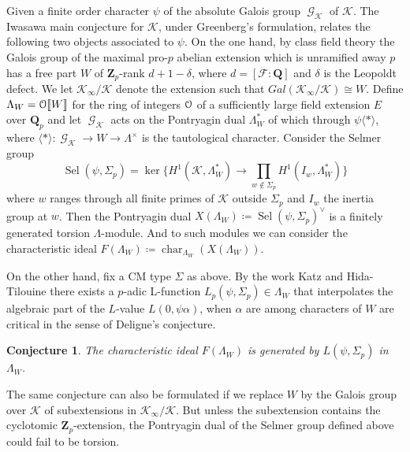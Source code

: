 \documentclass[leqno]{amsart}
\newtheorem{conj}[thm]{Conjecture}
\theoremstyle{definition}
\theoremstyle{remark}
\newcommand{\eo}{\EuScript{O}}
\newcommand{\Q}{{\mathbf{Q}}}
\newcommand{\Qp}{\mathbf{Q}_p}
\newcommand{\Zp}{\mathbf{Z}_p}
\DeclareMathOperator{\Gal}{\mathcal{G}}
\newcommand{\F}{{\mathcal{F}}} %
\newcommand{\K}{{\mathcal{K}}} %
\DeclareMathOperator{\Sel}{Sel}
\DeclareMathOperator{\car}{char}
\begin{document}
Given a finite order character $\psi$
of the absolute Galois group $\Gal_\K$ of $\K$.
The Iwasawa main conjecture for $\K$,
under Greenberg's formulation,
relates the following two objects associated to $\psi$.
On the one hand, 
by class field theory the Galois group of
the maximal pro-$p$ abelian extension which is unramified 
away $p$ has a free part $W$ of $\Zp$-rank $d+1-\delta$,
where $d=[\F:\Q]$ and $\delta$ is the Leopoldt defect.
We let $\K_\infty/\K$ denote the extension such that 
$Gal(\K_\infty/\K)\cong W$.
Define $\Lambda_W=\eo\llbracket W\rrbracket$
for the ring of integers $\eo$ of a sufficiently large
field extension $E$ over $\Qp$
and let $\Gal_\K$ acts on 
the Pontryagin dual $\Lambda_W^*$ of which through
$\psi\langle*\rangle$, where 
$\langle*\rangle\colon \Gal_\K\to W\to \Lambda^\times$
is the tautological character. 
Consider the Selmer group
\[
    \Sel(\psi,\Sigma_p)=\ker
    \big\{
    H^1(\K, \Lambda_W^*)\to \prod_{w\notin \Sigma_p}
    H^1(I_w, \Lambda_W^*)
    \big\}
\]
where $w$ ranges through all finite primes of $\K$
outside $\Sigma_p$
and $I_w$ the inertia group at $w$.
Then the Pontryagin dual 
$X(\Lambda_W)\coloneqq \Sel(\psi,\Sigma_p)^\vee$
is a finitely generated torsion $\Lambda$-module.
And to such modules we can consider the characteristic ideal
$F(\Lambda_W)\coloneqq \car_{\Lambda_W}(X(\Lambda_W))$.

On the other hand, fix a CM type $\Sigma$ as above.
By the work Katz \cite{Katz1978} 
and Hida-Tilouine \cite{HT93} there exists 
a $p$-adic L-function
$L_p(\psi,\Sigma_p)\in \Lambda_W$ 
that interpolates the algebraic part
of the $L$-value $L(0,\psi\alpha)$,
when $\alpha$ are among characters of $W$
are critical in the sense of Deligne's conjecture.

\begin{conj}
The characteristic ideal $F(\Lambda_W)$
is generated by $L(\psi,\Sigma_p)$ in $\Lambda_W$.
\end{conj}


The same conjecture can also be formulated if we replace
$W$ by the Galois group over $\K$
of subextensions in $\K_\infty/\K$.
But unless the subextension contains the 
cyclotomic $\Zp$-extension,
the Pontryagin dual of the Selmer group defined above
could fail to be torsion.
\end{document}
